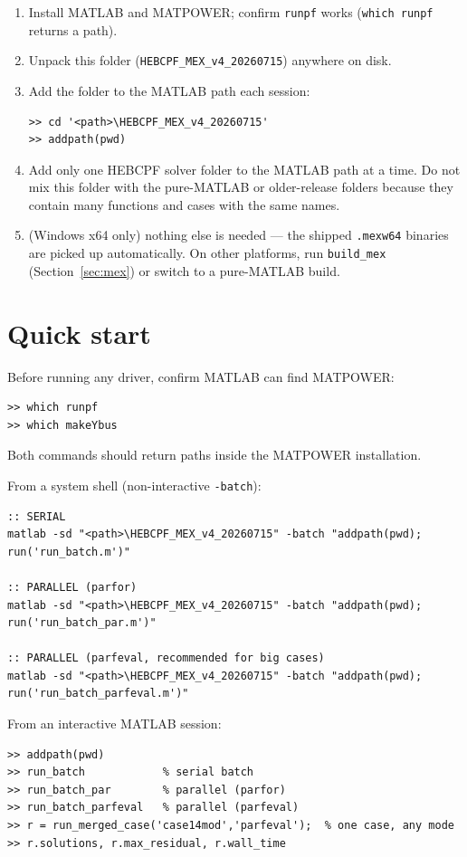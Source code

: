 \documentclass[11pt,a4paper]{article}
\newcommand{\code}[1]{\texttt{#1}}
\begin{document}
\begin{enumerate}[leftmargin=1.6em]
  \item Install MATLAB and MATPOWER; confirm \code{runpf} works
        (\code{which runpf} returns a path).
  \item Unpack this folder (\code{HEBCPF_MEX_v4_20260715}) anywhere on disk.
  \item Add the folder to the MATLAB path each session:
\begin{lstlisting}
>> cd '<path>\HEBCPF_MEX_v4_20260715'
>> addpath(pwd)
\end{lstlisting}
  \item Add only one HEBCPF solver folder to the MATLAB path at a time. Do not mix this
        folder with the pure-MATLAB or older-release folders because they contain many
        functions and cases with the same names.
  \item (Windows x64 only) nothing else is needed --- the shipped \code{.mexw64} binaries
        are picked up automatically. On other platforms, run \code{build_mex}
        (Section~\ref{sec:mex}) or switch to a pure-MATLAB build.
\end{enumerate}

\section{Quick start}

Before running any driver, confirm MATLAB can find MATPOWER:
\begin{lstlisting}[style=mat]
>> which runpf
>> which makeYbus
\end{lstlisting}
Both commands should return paths inside the MATPOWER installation.

From a system shell (non-interactive \code{-batch}):
\begin{lstlisting}[style=sh]
:: SERIAL
matlab -sd "<path>\HEBCPF_MEX_v4_20260715" -batch "addpath(pwd); run('run_batch.m')"

:: PARALLEL (parfor)
matlab -sd "<path>\HEBCPF_MEX_v4_20260715" -batch "addpath(pwd); run('run_batch_par.m')"

:: PARALLEL (parfeval, recommended for big cases)
matlab -sd "<path>\HEBCPF_MEX_v4_20260715" -batch "addpath(pwd); run('run_batch_parfeval.m')"
\end{lstlisting}

From an interactive MATLAB session:
\begin{lstlisting}[style=mat]
>> addpath(pwd)
>> run_batch            % serial batch
>> run_batch_par        % parallel (parfor)
>> run_batch_parfeval   % parallel (parfeval)
>> r = run_merged_case('case14mod','parfeval');  % one case, any mode
>> r.solutions, r.max_residual, r.wall_time
\end{lstlisting}
\end{document}
